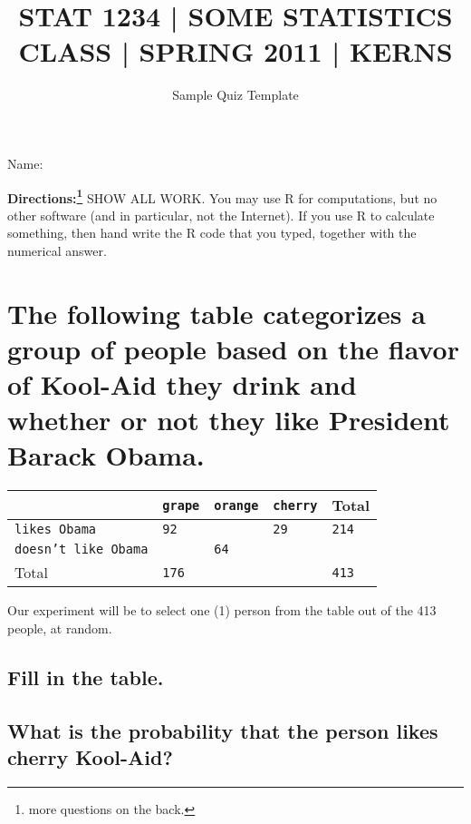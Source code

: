 \documentclass[11pt]{article}
\title{\large STAT 1234 | SOME STATISTICS CLASS | SPRING 2011 | KERNS}
\date{Sample Quiz Template}
\begin{document}
\maketitle



\begin{flushright}
Name: \underbar{\makebox[2in]{}}
\par
\end{flushright}
\vspace{0.1in}

\noindent \textbf{Directions:\footnote{more questions on the back. }}   SHOW ALL WORK. You may use \textsf{R} for computations, but no other software (and in particular, not the Internet). If you use \textsf{R} to calculate something, then hand write the \textsf{R} code that you typed, together with the numerical answer.



\section{The following table categorizes a group of people based on the flavor of Kool-Aid they drink and whether or not they like President Barack Obama.}
\label{sec-1}




\begin{center}
\begin{tabular}{lllll}
                              &  \texttt{grape}  &  \texttt{orange}  &  \texttt{cherry}  &  Total         \\
\hline
 \texttt{likes Obama}         &  \texttt{92}     &                   &  \texttt{29}      &  \texttt{214}  \\
 \texttt{doesn't like Obama}  &                  &  \texttt{64}      &                   &                \\
\hline
 Total                        &  \texttt{176}    &                   &                   &  \texttt{413}  \\
\end{tabular}
\end{center}



Our experiment will be to select one (1) person from the table out of the  413 people, at random.  
\subsection{Fill in the table.}
\label{sec-1_1}
\subsection{What is the probability that the person likes  cherry Kool-Aid?}
\label{sec-1_2}
\end{document}
